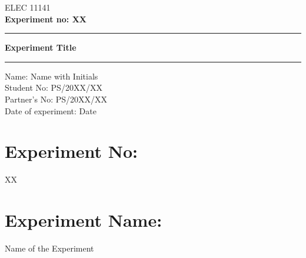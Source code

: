 \documentclass[11pt]{report}	%
\begin{document}

\begin{titlepage}	%
\centering 	%

\vspace*{\fill} 	%

\large{ELEC 11141}\\ 	%

\LARGE\textbf{Experiment no: XX} 	%

\raisebox{-\baselineskip}{\rule{\textwidth}{1px}}
\rule{\textwidth}{1px}
\vspace{0.5 cm}	%
					
\huge\textbf{Experiment Title} 	%

\vspace{0.5 cm}	%

\rule{\textwidth}{1px}
\vspace{6 cm}	%

\begin{flushleft} 	%
\large{Name: Name with Initials\\		%
	   Student No: PS/20XX/XX \\
	   Partner's No: PS/20XX/XX\\
	   Date of experiment: Date\\}

\vspace*{\fill}	

\end{flushleft}
\end{titlepage}	%


\section*{Experiment No:} 
XX 	%

\section*{Experiment Name:}
 Name of the Experiment  	%
\end{document}
